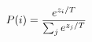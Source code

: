 \documentclass[preview]{standalone}
\begin{document}
\begin{align*}
\special{dvisvgm:raw <g id='unique000'>}P(i) = \frac{e^{z_i/T}}{\sum_j e^{z_j/T}}\special{dvisvgm:raw </g>}
\end{align*}
\end{document}
